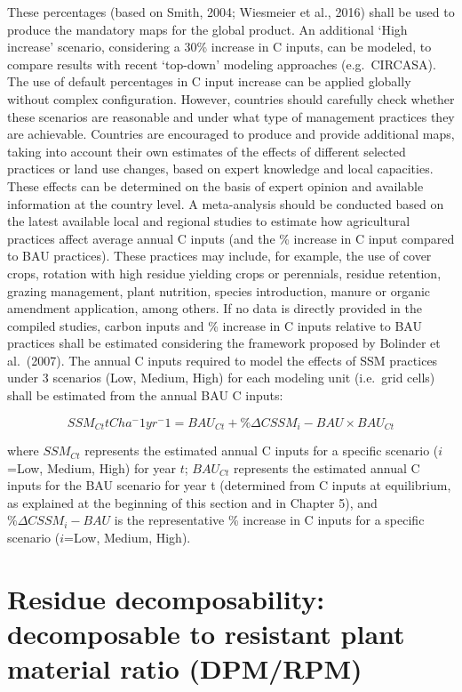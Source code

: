 \documentclass[
  10pt,
  b5paper,
]{book}
\begin{document}
These percentages (based on Smith, 2004; Wiesmeier et al., 2016) shall be used to produce the mandatory maps for the global product. An additional `High increase' scenario, considering a 30\% increase in C inputs, can be modeled, to compare results with recent `top-down' modeling approaches (e.g.~CIRCASA).
The use of default percentages in C input increase can be applied globally without complex configuration. However, countries should carefully check whether these scenarios are reasonable and under what type of management practices they are achievable. Countries are encouraged to produce and provide additional maps, taking into account their own estimates of the effects of different selected practices or land use changes, based on expert knowledge and local capacities. These effects can be determined on the basis of expert opinion and available information at the country level. A meta-analysis should be conducted based on the latest available local and regional studies to estimate how agricultural practices affect average annual C inputs (and the \% increase in C input compared to BAU practices). These practices may include, for example, the use of cover crops, rotation with high residue yielding crops or perennials, residue retention, grazing management, plant nutrition, species introduction, manure or organic amendment application, among others. If no data is directly provided in the compiled studies, carbon inputs and \% increase in C inputs relative to BAU practices shall be estimated considering the framework proposed by Bolinder et al.~(2007).
The annual C inputs required to model the effects of SSM practices under 3 scenarios (Low, Medium, High) for each modeling unit (i.e.~grid cells) shall be estimated from the annual BAU C inputs:

\begin{equation}
\tag{6.14}
SSM_{Ct} t C ha^-1 yr^-1 = BAU_{Ct} + \% \Delta CSSM_i - BAU \times  BAU_{Ct}
\end{equation}

where \(SSM_{Ct}\) represents the estimated annual C inputs for a specific scenario (\(i\) =Low, Medium, High) for year \(t\); \(BAU_{Ct}\) represents the estimated annual C inputs for the BAU scenario for year t (determined from C inputs at equilibrium, as explained at the beginning of this section and in Chapter 5), and
\(\% \Delta CSSM_i - BAU\) is the representative \% increase in C inputs for a specific scenario (\(i\)=Low, Medium, High).

\hypertarget{residue-decomposability-decomposable-to-resistant-plant-material-ratio-dpmrpm}{%
\section{Residue decomposability: decomposable to resistant plant material ratio (DPM/RPM)}\label{residue-decomposability-decomposable-to-resistant-plant-material-ratio-dpmrpm}}
\end{document}
